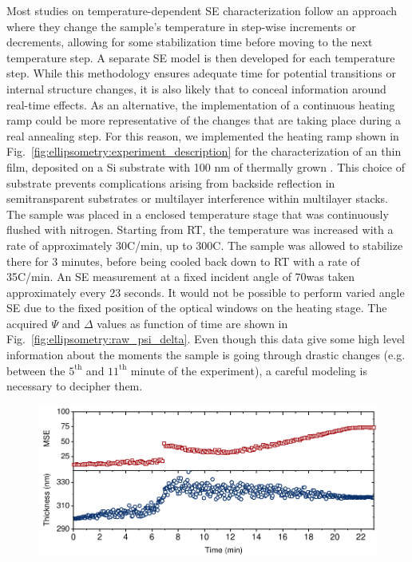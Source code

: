 Most studies on temperature-dependent SE characterization follow an approach where they change the sample's temperature in step-wise increments or decrements, allowing for some stabilization time before moving to the next temperature step. A separate SE model is then developed for each temperature step. While this methodology ensures adequate time for potential transitions or internal structure changes, it is also likely that to conceal information around real-time effects. As an alternative, the implementation of a continuous heating ramp could be more representative of the changes that are taking place during a real annealing step. For this reason, we implemented the heating ramp shown in Fig.~\ref{fig:ellipsometry:experiment_description} for the characterization of an   thin film, deposited on a Si substrate with 100 nm of thermally grown . This choice of substrate prevents complications arising from backside reflection in semitransparent substrates or multilayer interference within multilayer stacks. The sample was placed in a enclosed temperature stage that was continuously flushed with nitrogen. Starting from RT, the temperature was increased with a rate of approximately 30\degree C/min, up to 300\degree C. The sample was allowed to stabilize there for 3 minutes, before being cooled back down to RT with a rate of 35\degree C/min. An SE measurement at a fixed incident angle of 70\degree was taken approximately every 23 seconds. It would not be possible to perform varied angle SE due to the fixed position of the optical windows on the heating stage. The acquired $\Psi$ and $\Delta$ values
as function of time are shown in Fig.~\ref{fig:ellipsometry:raw_psi_delta}. Even though this data give some high level information about the moments the sample is going through drastic changes (e.g. between the $5^{\text{th}}$ and $11^{\text{th}}$ minute of the experiment), a careful modeling is necessary to decipher them. 

\begin{figure}
  \centering
  \medskip
  \includegraphics[width=.77\textwidth]{chapters/ellipsometry/image/wrong_model.pdf}
  \caption{}
  \label{fig:ellipsometry:wrong_model}
\end{figure}

